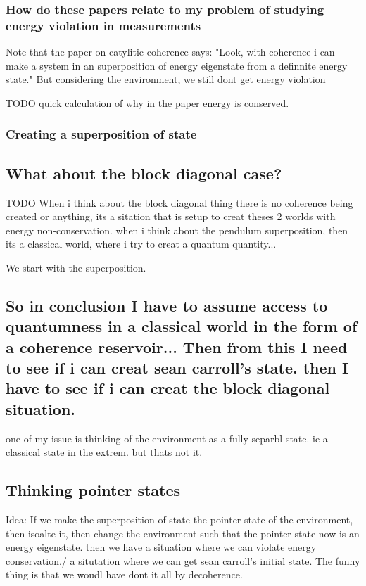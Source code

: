 \documentclass{article}
\begin{document}
\subsubsection{How do these papers relate to my problem of studying energy violation in measurements}

Note that the paper on catylitic coherence says: "Look, with coherence i can make a system in an superposition of energy eigenstate from a definnite energy state." But considering the environment, we still dont get energy violation

TODO quick calculation of why in the paper energy is conserved.

\subsubsection{Creating a superposition of state}

\subsection{What about the block diagonal case?}
TODO
When i think about the block diagonal thing there is no coherence being created or anything, its a sitation that is setup to creat theses 2 worlds with energy non-conservation. when i think about the pendulum superposition, then its a classical world, where i try to creat a quantum quantity... 

We start with the superposition.

\subsection{So in conclusion I have to assume access to quantumness in a classical world in the form of a coherence reservoir... Then from this I need to see if i can creat sean carroll's state. then I have to see if i can creat the block diagonal situation.}


one of my issue is thinking of the environment as a fully separbl state. ie a classical state in the extrem. but thats not it.


\subsection{Thinking pointer states}
Idea: If we make the superposition of state the pointer state of the environment, then isoalte it, then change the environment such that the pointer state now is an energy eigenstate. then we have a situation where we can violate energy conservation./ a situtation where we can get sean carroll's initial state. 
The funny thing is that we woudl have dont it all by decoherence.
\end{document}
